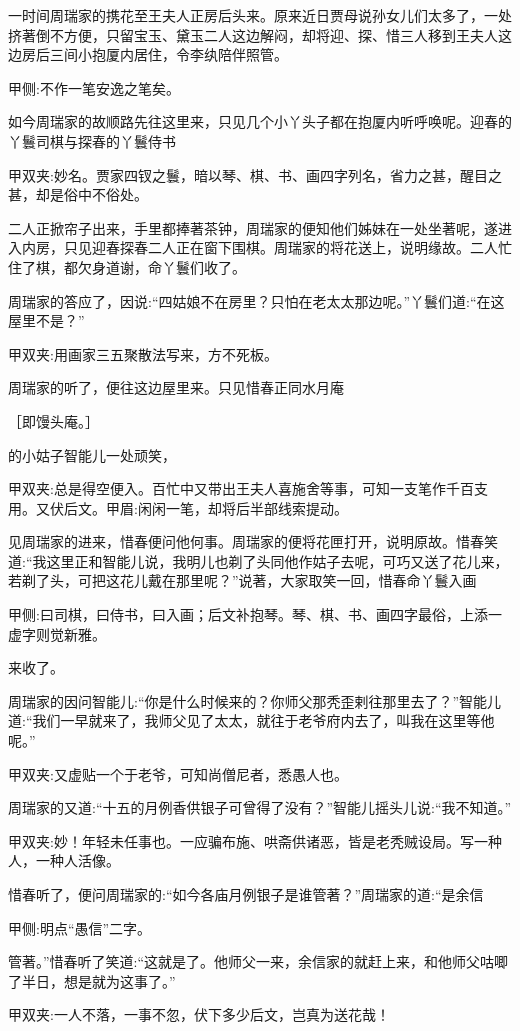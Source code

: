 \begin{parag}
    一时间周瑞家的携花至王夫人正房后头来。原来近日贾母说孙女儿们太多了，一处挤著倒不方便，只留宝玉、黛玉二人这边解闷，却将迎、探、惜三人移到王夫人这边房后三间小抱厦内居住，令李纨陪伴照管。\begin{note}甲侧:不作一笔安逸之笔矣。\end{note}如今周瑞家的故顺路先往这里来，只见几个小丫头子都在抱厦内听呼唤呢。迎春的丫鬟司棋与探春的丫鬟侍书\begin{note}甲双夹:妙名。贾家四钗之鬟，暗以琴、棋、书、画四字列名，省力之甚，醒目之甚，却是俗中不俗处。\end{note}二人正掀帘子出来，手里都捧著茶钟，周瑞家的便知他们姊妹在一处坐著呢，遂进入内房，只见迎春探春二人正在窗下围棋。周瑞家的将花送上，说明缘故。二人忙住了棋，都欠身道谢，命丫鬟们收了。
\end{parag}


\begin{parag}
    周瑞家的答应了，因说:“四姑娘不在房里？只怕在老太太那边呢。”丫鬟们道:“在这屋里不是？”\begin{note}甲双夹:用画家三五聚散法写来，方不死板。\end{note}周瑞家的听了，便往这边屋里来。只见惜春正同水月庵\begin{note}［即馒头庵。］\end{note}的小姑子智能儿一处顽笑，\begin{note}甲双夹:总是得空便入。百忙中又带出王夫人喜施舍等事，可知一支笔作千百支用。又伏后文。甲眉:闲闲一笔，却将后半部线索提动。\end{note}见周瑞家的进来，惜春便问他何事。周瑞家的便将花匣打开，说明原故。惜春笑道:“我这里正和智能儿说，我明儿也剃了头同他作姑子去呢，可巧又送了花儿来，若剃了头，可把这花儿戴在那里呢？”说著，大家取笑一回，惜春命丫鬟入画\begin{note}甲侧:曰司棋，曰侍书，曰入画；后文补抱琴。琴、棋、书、画四字最俗，上添一虚字则觉新雅。\end{note}来收了。
\end{parag}


\begin{parag}
    周瑞家的因问智能儿:“你是什么时候来的？你师父那秃歪剌往那里去了？”智能儿道:“我们一早就来了，我师父见了太太，就往于老爷府内去了，叫我在这里等他呢。”\begin{note}甲双夹:又虚贴一个于老爷，可知尚僧尼者，悉愚人也。\end{note}周瑞家的又道:“十五的月例香供银子可曾得了没有？”智能儿摇头儿说:“我不知道。”\begin{note}甲双夹:妙！年轻未任事也。一应骗布施、哄斋供诸恶，皆是老秃贼设局。写一种人，一种人活像。\end{note}惜春听了，便问周瑞家的:“如今各庙月例银子是谁管著？”周瑞家的道:“是余信\begin{note}甲侧:明点“愚信”二字。\end{note}管著。”惜春听了笑道:“这就是了。他师父一来，余信家的就赶上来，和他师父咕唧了半日，想是就为这事了。”\begin{note}甲双夹:一人不落，一事不忽，伏下多少后文，岂真为送花哉！\end{note}
\end{parag}


